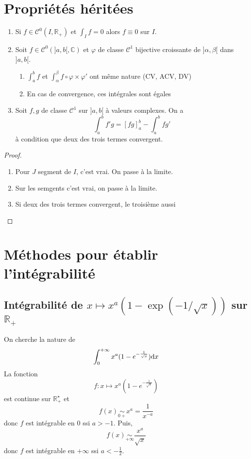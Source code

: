 \section{Propriétés héritées}

\begin{prop}
    \begin{enumerate}
        \item Si $f\in\mathcal C^0(I, \mathbb R_+)$ et $\int_If=0$ alors $f\equiv 0$ sur $I$.
        \item Soit $f\in\mathcal C^0(]a, b[, \mathbb C)$ et $\varphi$ de classe $\mathcal C^1$ bijective croissante de $]\alpha, \beta[$ dans $]a, b[$. \begin{enumerate}
            \item $\int_a^bf$ et $\int_\alpha^\beta f\circ \varphi\times \varphi'$ ont même nature (CV, ACV, DV)
            \item En cas de convergence, ces intégrales sont égales
        \end{enumerate}
    \item Soit $f, g$ de classe $\mathcal C^1$ sur $]a, b[$ à valeurs complexes. On a \[
            \int_a^bf'g=[fg]_a^b-\int_a^bfg'
        \]
        à condition que deux des trois termes convergent.
    \end{enumerate}
\end{prop}

\begin{proof}~
    \begin{enumerate}
        \item Pour $J$ segment de $I$, c'est vrai. On passe à la limite.
        \item Sur les semgents c'est vrai, on passe à la limite.
        \item Si deux des trois termes convergent, le troisième aussi
    \end{enumerate}
\end{proof}

\section{Méthodes pour établir l'intégrabilité}

\subsection{Intégrabilité de $x\longmapsto x^a(1-\exp(-1/\sqrt x))$ sur $\mathbb R_+$}

On cherche la nature de \[
    \int_0^{+\infty} x^a(1-e^{-\frac1{\sqrt x}})\mathrm{d} x
\]
La fonction \[
    f:x\longmapsto x^a(1-e^{-\frac1{\sqrt x}})
\]
est continue sur $\mathbb R_+^\star$ et \[
    f(x)\underset{0+}\sim x^a=\frac1{x^{-a}}
\]
donc $f$ est intégrable en $0$ ssi $a>-1$. Puis, \[
    f(x)\underset{+\infty}\sim\frac{x^a}{\sqrt x}
\]
donc $f$ est intégrable en $+\infty$ ssi $a<-\frac12$.

